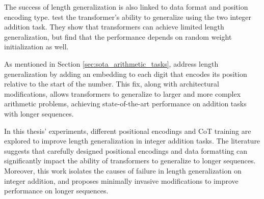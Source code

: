The success of length generalization is also linked to data format and position encoding type. \cite{zhou_transformers_2024} test the transformer's ability to generalize using the two integer addition task. They show that transformers can achieve limited length generalization, but find that the performance depends on random weight initialization as well.

As mentioned in Section \ref{sec:sota_arithmetic_tasks}, \cite{mcleish_transformers_2024} address length generalization by adding an embedding to each digit that encodes its position relative to the start of the number. This fix, along with architectural modifications, allows transformers to generalize to larger and more complex arithmetic problems, achieving state-of-the-art performance on addition tasks with longer sequences.

In this thesis' experiments, different positional encodings and CoT training are explored to improve length generalization in integer addition tasks. The literature suggests that carefully designed positional encodings and data formatting can significantly impact the ability of transformers to generalize to longer sequences. Moreover, this work isolates the causes of failure in length generalization on integer addition, and proposes minimally invasive modifications to improve performance on longer sequences.